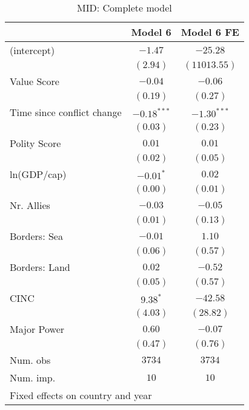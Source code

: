 
\begin{table}
\begin{center}
\begin{tabular}{l c c}
\toprule
 & Model 6 & Model 6 FE \\
\midrule
(intercept)                & $-1.47$       & $-25.28$      \\
                           & $(2.94)$      & $(11013.55)$  \\
Value Score                & $-0.04$       & $-0.06$       \\
                           & $(0.19)$      & $(0.27)$      \\
Time since conflict change & $-0.18^{***}$ & $-1.30^{***}$ \\
                           & $(0.03)$      & $(0.23)$      \\
Polity Score               & $0.01$        & $0.01$        \\
                           & $(0.02)$      & $(0.05)$      \\
ln(GDP/cap)                & $-0.01^{*}$   & $0.02$        \\
                           & $(0.00)$      & $(0.01)$      \\
Nr. Allies                 & $-0.03$       & $-0.05$       \\
                           & $(0.01)$      & $(0.13)$      \\
Borders: Sea               & $-0.01$       & $1.10$        \\
                           & $(0.06)$      & $(0.57)$      \\
Borders: Land              & $0.02$        & $-0.52$       \\
                           & $(0.05)$      & $(0.57)$      \\
CINC                       & $9.38^{*}$    & $-42.58$      \\
                           & $(4.03)$      & $(28.82)$     \\
Major Power                & $0.60$        & $-0.07$       \\
                           & $(0.47)$      & $(0.76)$      \\
\midrule
Num. obs                   & $3734$        & $3734$        \\
Num. imp.                  & $10$          & $10$          \\
\bottomrule
\multicolumn{3}{l}{\scriptsize{%
               Fixed effects on country and year}}
\end{tabular}
\caption{MID: Complete model}
\label{MID_3}
\end{center}
\end{table}

